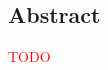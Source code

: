 \vspace*{\fill}

\begin{center}
\section*{Abstract}

\textcolor{red}{TODO}

\end{center}

\vspace*{\fill}